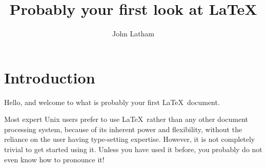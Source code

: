 \documentclass[12pt,a4paper]{article}
\title{Probably your first look at \LaTeX}
\author{John Latham}
\begin{document}

\maketitle


\tableofcontents




\section{Introduction}



Hello, and welcome to what is probably your first \LaTeX\ document.

Most expert Unix users prefer to use \LaTeX\ rather than any other document
processing system, because of its inherent power and flexibility, without the
reliance on the user having type-setting expertise. However, it is not
completely trivial to get started using it. Unless you have used it before,
you probably do not even know how to pronounce it!
\end{document}

